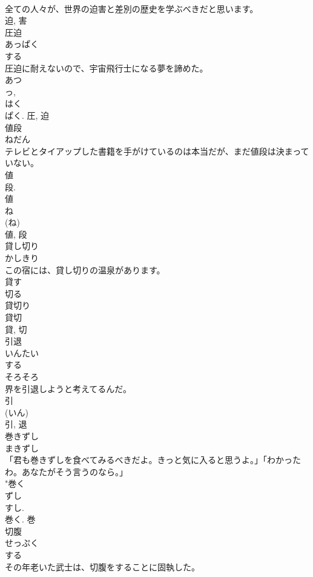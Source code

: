 \documentclass[8pt]{extreport}
\begin{document}
\begin{CJK}{UTF8}{min}
\\	全ての人々が、世界の迫害と差別の歴史を学ぶべきだと思います。	
\\	迫, 害	
\\	圧迫	
\\	あっぱく	
\\	する 
\\	圧迫に耐えないので、宇宙飛行士になる夢を諦めた。	
\\	あつ 
\\	っ, 
\\	はく 
\\	ぱく.	圧, 迫	
\\	値段	
\\	ねだん	
\\	テレビとタイアップした書籍を手がけているのは本当だが、まだ値段は決まっていない。	
\\	値 
\\	段. 
\\	値 
\\	ね 
\\	(ね) 
\\	値, 段	
\\	貸し切り	
\\	かしきり	
\\	この宿には、貸し切りの温泉があります。	
\\	貸す 
\\	切る 
\\	貸切り 
\\	貸切 
\\	貸, 切	
\\	引退	
\\	いんたい	
\\	する 
\\	そろそろ
\\	界を引退しようと考えてるんだ。	
\\	引 
\\	(いん) 
\\	引, 退	
\\	巻きずし	
\\	まきずし	
\\	「君も巻きずしを食べてみるべきだよ。きっと気に入ると思うよ。」「わかったわ。あなたがそう言うのなら。」	
\\	"巻く 
\\	ずし 
\\	すし. 
\\	巻く.	巻	
\\	切腹	
\\	せっぷく	
\\	する 
\\	その年老いた武士は、切腹をすることに固執した。	

\end{CJK}
\end{document}
